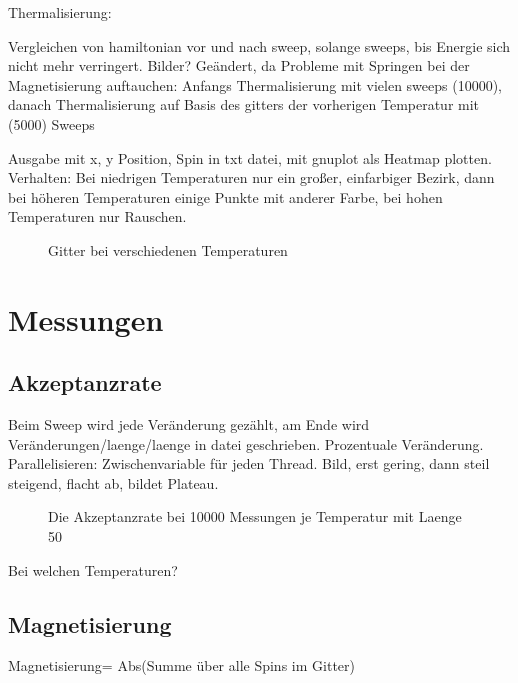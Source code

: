 \documentclass{scrreprt}
\begin{document}
	Thermalisierung:
	 
	Vergleichen von hamiltonian vor und nach sweep, solange sweeps, bis Energie sich nicht mehr verringert. Bilder?
	Geändert, da Probleme mit Springen bei der Magnetisierung auftauchen: Anfangs Thermalisierung mit vielen sweeps (10000), danach Thermalisierung auf Basis des gitters der vorherigen Temperatur mit (5000) Sweeps
	
	Ausgabe mit x, y Position, Spin in txt datei, mit gnuplot als Heatmap plotten.
	Verhalten: Bei niedrigen Temperaturen nur ein großer, einfarbiger Bezirk, dann bei höheren Temperaturen einige Punkte mit anderer Farbe, bei hohen Temperaturen nur Rauschen.
	
	\begin{figure}
	\begin{minipage}{0.48\textwidth}
		
	\end{minipage}
	\begin{minipage}{0.48\textwidth}
		
	\end{minipage}
	\begin{minipage}{0.48\textwidth}
		
	\end{minipage}
	\caption{Gitter bei verschiedenen Temperaturen}
	\label{fig:gitter}
	\end{figure}
	
	\section{Messungen}
	\subsection{Akzeptanzrate}
	Beim Sweep wird jede Veränderung gezählt, am Ende wird Veränderungen/laenge/laenge in datei geschrieben. Prozentuale Veränderung.
	Parallelisieren: Zwischenvariable für jeden Thread. Bild, erst gering, dann steil steigend, flacht ab, bildet Plateau.
	\begin{figure}
		
		\label{fig:akzeptanznaiv}
		\caption{Die Akzeptanzrate bei 10000 Messungen je Temperatur mit Laenge 50}
	\end{figure}
	Bei welchen Temperaturen?
	\subsection{Magnetisierung}
	Magnetisierung= Abs(Summe über alle Spins im Gitter)
	
\end{document}
